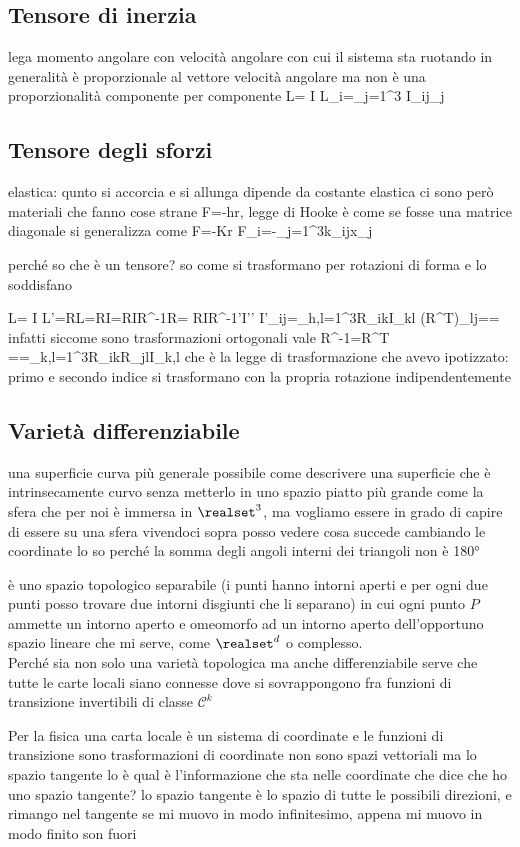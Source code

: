 \subsection{Tensore di inerzia}
lega momento angolare con velocità angolare con cui il sistema sta ruotando
in generalità è proporzionale al vettore velocità angolare ma non è una proporzionalità componente per componente
	\vba L= I\vba\omega
	L_i=\sum_{j=1}^3 I_{ij}\omega_j
\subsection{Tensore degli sforzi}
elastica: qunto si accorcia e si allunga dipende da costante elastica
ci sono però materiali che fanno cose strane
	\vba F=-h\vba r, legge di Hooke
è come se fosse una matrice diagonale
si generalizza come
	\vba F=-K\Delta\vba r
	F_i=-\sum_{j=1}^3k_{ij}\Delta x_j
	
perché so che è un tensore? so come si trasformano per rotazioni di forma e lo soddisfano

	\vba L= I\vba\omega {}
	\implies \vba L'=R\vba L=RI\vba\omega=RIR^{-1}R\vba\omega= RIR^{-1}\vba\omega'\equiv I'\vba\omega'
	\implies I'_{ij}=\sum_{h,l=1}^3R_{ik}I_{kl} (R^T)_{lj}==
infatti siccome sono trasformazioni ortogonali vale R^{-1}=R^T
	==\sum_{k,l=1}^3R_{ik}R_{jl}I_{k,l} 
che è la legge di trasformazione che avevo ipotizzato: primo e secondo indice si trasformano con la propria rotazione indipendentemente 

\subsection{Varietà differenziabile}
una superficie curva più generale possibile
come descrivere una superficie che è intrinsecamente curvo senza metterlo in uno spazio piatto più grande
come la sfera che per noi è immersa in $\realset^3$, ma vogliamo essere in grado di capire di essere su una sfera vivendoci sopra
posso vedere cosa succede cambiando le coordinate
lo so perché la somma degli angoli interni dei triangoli non è 180°
\begin{define}
	è uno spazio topologico separabile (i punti hanno intorni aperti e per ogni due punti posso trovare due intorni disgiunti che li separano) in cui ogni punto $P$ ammette un intorno aperto e omeomorfo ad un intorno aperto dell'opportuno spazio lineare che mi serve, come $\realset^d$ o complesso.\\
	Perché sia non solo una varietà topologica ma anche differenziabile serve che tutte le carte locali siano connesse dove si sovrappongono fra funzioni di transizione invertibili di classe $\mathcal{C}^k$
\end{define}
Per la fisica una carta locale è un sistema di coordinate e le funzioni di transizione sono trasformazioni di coordinate
non sono spazi vettoriali ma lo spazio tangente lo è
qual è l'informazione che sta nelle coordinate che dice che ho uno spazio tangente?
lo spazio tangente è lo spazio di tutte le possibili direzioni, e rimango nel tangente se mi muovo in modo infinitesimo, appena mi muovo in modo finito son fuori

